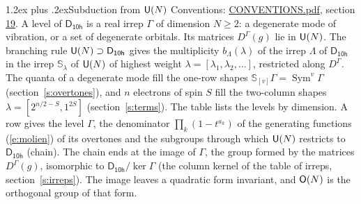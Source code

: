 \documentclass[10pt,a4paper]{article}
\makeatletter
\renewcommand\section{\@startsection{section}{1}{\z@}{-3ex plus -1ex minus -.2ex}%
  {1.2ex plus .2ex}{\normalfont\large\sffamily\bfseries\color{parttitle}}}
\numberwithin{equation}{section}
\newcommand{\grp}[1]{\mathsf{#1}}
\newcommand{\repD}[1]{D^{#1}}
\newcommand{\schur}[1]{\mathbb{S}_{#1}}
\newcommand{\shape}[1]{[#1]}
\makeatother
\begin{document}
\section{Subduction from \texorpdfstring{$\grp{U(\mathnormal{N})}$}{U(N)}}\label{s:unitary}
Conventions: \href{../../CONVENTIONS.pdf}{CONVENTIONS.pdf}, section \href{../../CONVENTIONS.pdf\#conv.19}{19}.
\leavevmode\label{n:local.level.dimension}A level of $\grp{D_{10h}}$ is a real irrep $\Gamma$ of dimension $N \ge 2$: a degenerate mode of vibration, or a set of degenerate orbitals. \label{n:group.unitary}Its matrices $\repD{\Gamma}(g)$ lie in $\grp{U(\mathnormal{N})}$. \label{n:irrep.schur}\label{n:shape.partition}\label{n:local.partition}\label{n:function.multiplicity.unitary}The branching rule $\grp{U(\mathnormal{N})} \supset \grp{D_{10h}}$ gives the multiplicity $b_\Lambda(\lambda)$ of the irrep $\Lambda$ of $\grp{D_{10h}}$ in the irrep $\schur{\lambda}$ of $\grp{U(\mathnormal{N})}$ of highest weight $\lambda = \shape{\lambda_1, \lambda_2, \dots}$, restricted along $\repD{\Gamma}$. \label{n:local.partition.power}\label{n:local.electrons}\label{n:local.spin}The quanta of a degenerate mode fill the one-row shapes $\schur{\shape{v}}\Gamma = \operatorname{Sym}^{v}\Gamma$ (section~\ref{s:overtones}), and $n$ electrons of spin $S$ fill the two-column shapes $\lambda = \shape{2^{n/2-S}, 1^{2S}}$ (section~\ref{s:terms}).
The table lists the levels by dimension. \label{n:head.level}\label{n:head.denominator}\label{n:index.overtone.denominator}\label{n:head.chain}A row gives the level $\Gamma$, the denominator $\prod_k (1 - t^{a_k})$ of the generating functions (\ref{e:molien}) of its overtones and the subgroups through which $\grp{U(\mathnormal{N})}$ restricts to $\grp{D_{10h}}$ (chain). The chain ends at the image of $\Gamma$, the group formed by the matrices $\repD{\Gamma}(g)$, isomorphic to $\grp{D_{10h}}/\ker\Gamma$ (the column kernel of the table of irreps, section~\ref{s:irreps}). The image leaves a quadratic form invariant, and $\grp{O(\mathnormal{N})}$ is the orthogonal group of that form.
\end{document}
